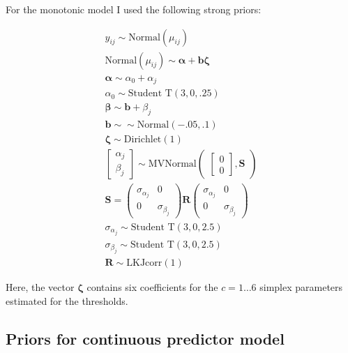 \documentclass[]{interact}
\theoremstyle{plain}%
\theoremstyle{definition}
\theoremstyle{remark}
\begin{document}
For the monotonic model I used the following strong priors:

$$
\begin{aligned}
y_{ij} \sim \text{Normal}(\mu_{ij}) \nonumber\\
\text{Normal}(\mu_{ij})\sim \boldsymbol{\alpha} + \boldsymbol{b} \boldsymbol{\zeta} \nonumber\\
\boldsymbol{\alpha} \sim \alpha_{0} +\alpha_j \nonumber\\
\alpha_{0} \sim \text{Student~T}(3, 0,.25)\nonumber\\
\boldsymbol{\beta}\sim \boldsymbol{b} + \beta_j \nonumber\\
\boldsymbol{b}\sim \sim \text{Normal}(-.05,.1) \nonumber\\
\boldsymbol{\zeta}\sim \text{Dirichlet}(1)
\nonumber\\
\begin{bmatrix}
\alpha_j \\
\beta_j
\end{bmatrix}
\sim 
\text{MVNormal}
\begin{pmatrix}
\begin{bmatrix}
0\\
0
\end{bmatrix}
,\boldsymbol{S} \nonumber
\end{pmatrix}\\
\boldsymbol{S} = 
\begin{pmatrix}
\sigma_{\alpha_j} & 0 \\
0 & \sigma_{\beta_j} \nonumber
\end{pmatrix} \boldsymbol{R} \begin{pmatrix}
\sigma_{\alpha_j} & 0 \\
0 & \sigma_{\beta_j} \nonumber
\end{pmatrix}\\
\sigma_{\alpha_j} \sim 
\text{Student~T}(3,0,2.5) \nonumber\\
\sigma_{\beta_j} \sim 
\text{Student~T}(3,0,2.5) \nonumber\\
\boldsymbol{R}\sim \text{LKJcorr}(1) \nonumber
\end{aligned}
$$

Here, the vector $\boldsymbol{\zeta}$ contains six coefficients for the $c = 1\dots 6$ simplex parameters estimated for the thresholds.

\newpage
\subsection{Priors for continuous predictor model}
\end{document}

